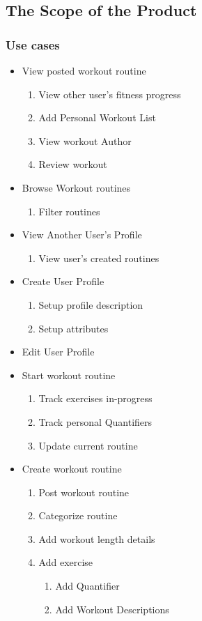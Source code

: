 \documentclass[12pt]{article}
\begin{document}
	\subsection{The Scope of the Product}
	\subsubsection{Use cases}
	
	\begin{itemize}
		\item View posted workout routine 
		\begin{enumerate}
			\item View other user's fitness progress
			\item Add Personal Workout List
			\item View workout Author
			\item Review workout
		\end{enumerate}
		
		\item Browse Workout routines
		\begin{enumerate}
			\item Filter routines
		\end{enumerate}
		
		\item View Another User's Profile
		\begin{enumerate}
			\item View user's created routines
		\end{enumerate}
		
		\item Create User Profile
		\begin{enumerate}
			\item Setup profile description
			\item Setup attributes
		\end{enumerate}
		
		\item Edit User Profile
		
		\item Start workout routine
		\begin{enumerate}
			\item Track exercises in-progress
			\item Track personal Quantifiers
			\item Update current routine
		\end{enumerate}
		
		
		\item Create workout routine
		\begin{enumerate}
			\item Post workout routine
			\item Categorize routine
			\item Add workout length details
			\item Add exercise 
			\begin{enumerate}
				\item Add Quantifier
				\item Add Workout Descriptions
			\end{enumerate}
		\end{enumerate}
		

\end{itemize}
\end{document}
